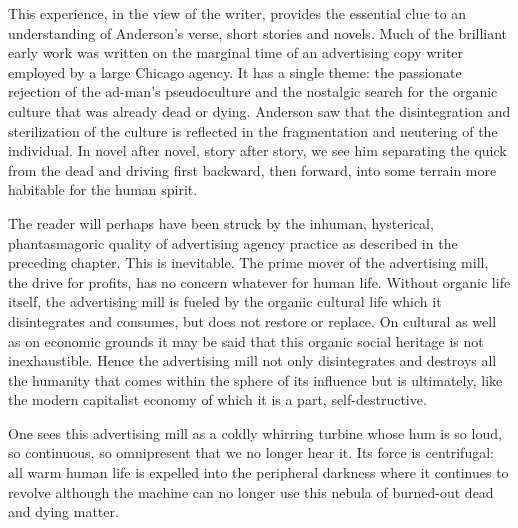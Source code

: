 \documentclass[twoside,nohyper,openany,nobib]{tufte-book}
\begin{document}
This experience, in the view of the writer, provides the essential clue
to an understanding of Anderson's verse, short stories and novels. Much
of the brilliant early work was written on the marginal time of an
advertising copy writer employed by a large Chicago agency. It has a
single theme: the passionate rejection of the ad-man's pseudoculture and
the nostalgic search for the organic culture that was already dead or
dying. Anderson saw that the disintegration and sterilization of the
culture is reflected in the fragmentation and neutering of the
individual. In novel after novel, story after story, we see him
separating the quick from the dead and driving first backward, then
forward, into some terrain more habitable for the human spirit.

The reader will perhaps have been struck by the inhuman, hysterical,
phantasmagoric quality of advertising agency practice as described in
the preceding chapter. This is inevitable. The prime mover of the
advertising mill, the drive for profits, has no concern whatever for
human life. Without organic life itself, the advertising mill is fueled
by the organic cultural life which it disintegrates and consumes, but
does not restore or replace. On cultural as well as on economic grounds
it may be said that this organic social heritage is not inexhaustible.
Hence the advertising mill not only disintegrates and destroys all the
humanity that comes within the sphere of its influence but is
ultimately, like the modern capitalist economy of which it is a part,
self-destructive.

One sees this advertising mill as a coldly whirring turbine whose hum is
so loud, so continuous, so omnipresent that we no longer hear it. Its
force is centrifugal: all warm human life is expelled into the
peripheral darkness where it continues to revolve although the machine
can no longer use this nebula of burned-out dead and dying matter.
\end{document}
